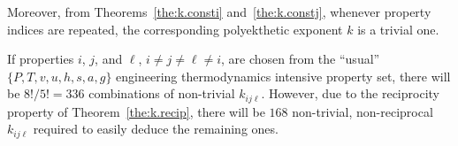     Moreover, from Theorems~\ref{the:k.consti} and~\ref{the:k.constj}, whenever property indices
    are repeated, the corresponding polyekthetic exponent $k$ is a trivial one.

    If properties $i$, $j$, and $\ell$, $i \neq j  \neq  \ell  \neq  i$,  are  chosen  from  the
    ``usual'' $\{P, T, v, u, h, s, a, g\}$ engineering thermodynamics  intensive  property  set,
    there will be $8!/5! = 336$ combinations of non-trivial $k_{ij\ell}$. However,  due  to  the
    reciprocity  property  of  Theorem~\ref{the:k.recip},  there  will  be  $168$   non-trivial,
    non-reciprocal $k_{ij\ell}$ required to easily deduce the remaining ones.


